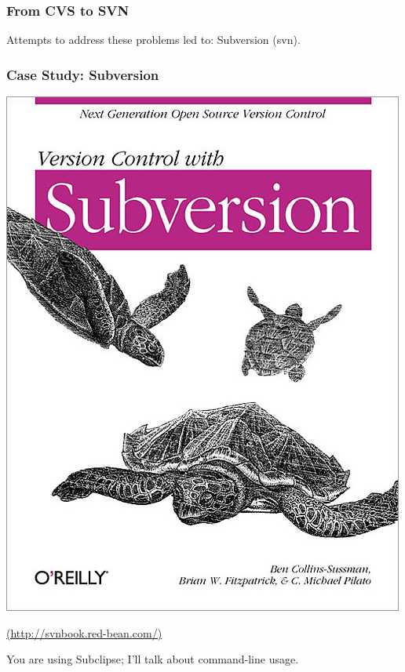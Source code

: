 \begin{frame}
\frametitle{From CVS to SVN}
\begin{changemargin}{1cm}

Attempts to address these problems led to: Subversion (\alert{svn}).


\end{changemargin}
\end{frame}

\begin{frame}

\frametitle{Case Study: Subversion}

\begin{center}
\includegraphics[height=0.7\textheight]{images/subversion}
\end{center}
\hfill \url{(http://svnbook.red-bean.com/)}

You are using Subclipse; I'll talk about command-line usage.
\end{frame}

